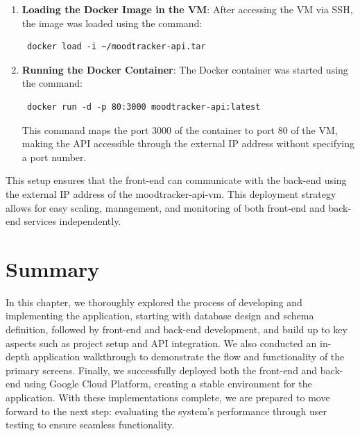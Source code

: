 \begin{enumerate}
    \item \textbf{Loading the Docker Image in the VM}: After accessing the VM via SSH, the image was loaded using the command: \begin{verbatim} docker load -i ~/moodtracker-api.tar \end{verbatim}
    
    \item \textbf{Running the Docker Container}: The Docker container was started using the command: \begin{verbatim} docker run -d -p 80:3000 moodtracker-api:latest \end{verbatim}
    This command maps the port 3000 of the container to port 80 of the VM, making the API accessible through the external IP address without specifying a port number.
\end{enumerate}

\noindent This setup ensures that the front-end can communicate with the back-end using the external IP address of the moodtracker-api-vm. This deployment strategy allows for easy scaling, management, and monitoring of both front-end and back-end services independently.


\section{Summary}

In this chapter, we thoroughly explored the process of developing and implementing the application, starting with database design and schema definition, followed by front-end and back-end development, and build up to key aspects such as project setup and API integration. We also conducted an in-depth application walkthrough to demonstrate the flow and functionality of the primary screens. Finally, we successfully deployed both the front-end and back-end using Google Cloud Platform, creating a stable environment for the application. With these implementations complete, we are prepared to move forward to the next step: evaluating the system’s performance through user testing to ensure seamless functionality.